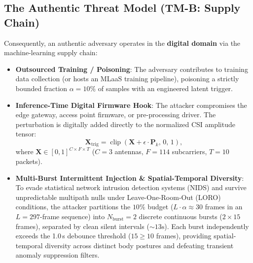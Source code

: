\documentclass{article}
\newcommand{\Nb}{N_{\mathrm{burst}}}
\begin{document}
\subsection{The Authentic Threat Model (TM-B: Supply Chain)}

Consequently, an authentic adversary operates in the \textbf{digital domain} via the
machine-learning supply chain:
\begin{itemize}
    \item \textbf{Outsourced Training / Poisoning}: The adversary contributes to training data
          collection (or hosts an MLaaS training pipeline), poisoning a strictly bounded fraction
          $\alpha = 10\%$ of samples with an engineered latent trigger.
    \item \textbf{Inference-Time Digital Firmware Hook}: The attacker compromises the edge
          gateway, access point firmware, or pre-processing driver. The perturbation is digitally
          added directly to the normalized CSI amplitude tensor:
          \begin{equation}
            \mathbf{X}_{\text{trig}} = \operatorname{clip}\!\left(\mathbf{X} + \epsilon \cdot
            \mathbf{P}_k,\, 0,\, 1\right),
          \end{equation}
          where $\mathbf{X} \in [0, 1]^{C \times F \times T}$
          ($C=3$ antennas, $F=114$ subcarriers, $T=10$ packets).
    \item \textbf{Multi-Burst Intermittent Injection \& Spatial-Temporal Diversity}: To evade
          statistical network intrusion detection systems (NIDS) and survive unpredictable
          multipath nulls under Leave-One-Room-Out (LORO) conditions, the attacker partitions the
          $10\%$ budget ($L \cdot \alpha \approx 30$ frames in an $L=297$-frame sequence) into
          $\Nb = 2$ discrete continuous bursts ($2 \times 15$ frames), separated by clean silent
          intervals ($\sim 13\text{s}$). Each burst independently exceeds the 1.0\,s debounce
          threshold ($15 \ge 10$ frames), providing spatial-temporal diversity across distinct
          body postures and defeating transient anomaly suppression filters.
\end{itemize}
\end{document}
